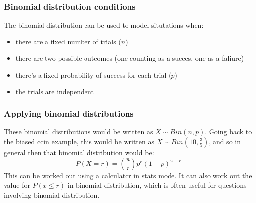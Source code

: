 \subsubsection{Binomial distribution conditions}
The binomial distribution can be used to model situtations when:
\begin{itemize}
	\item there are a fixed number of trials ($n$)
	\item there are two possible outcomes (one counting as a succes, one as a faliure)
	\item there's a fixed probability of success for each trial ($p$)
	\item the trials are independent
\end{itemize}

\subsubsection{Applying binomial distributions}
These binomial distributions would be written as $X \sim Bin(n,p)$. Going back to the biased coin example, this would be written as $X \sim Bin\left(10, \frac{3}{5}\right)$, and so in general then that binomial distribution would be:
\begin{equation}
	P(X=r) = \binom{n}{r}p^r(1-p)^{n-r}
\end{equation}
This can be worked out using a calculator in stats mode. It can also work out the value for $P(x\leq r)$ in binomial distribution, which is often useful for questions involving binomial distribution.
